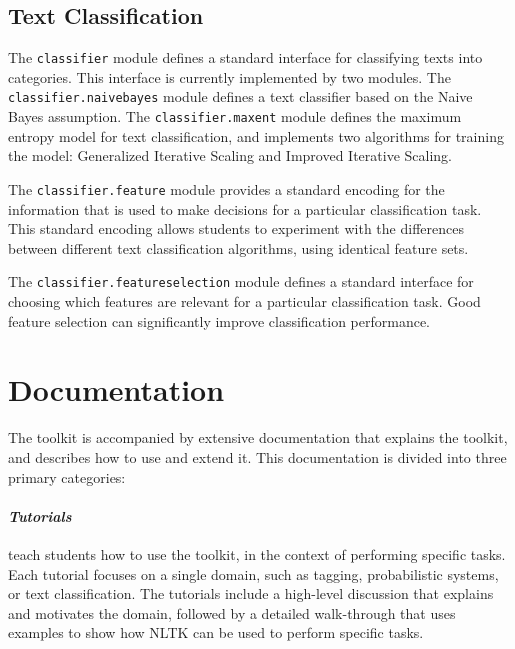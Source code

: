 \documentclass[11pt]{article}
\begin{document}
\subsection*{Text Classification}

The \texttt{classifier} module defines a standard interface for
classifying texts into categories.  This interface is currently
implemented by two modules.  The \texttt{classifier.naivebayes} module
defines a text classifier based on the Naive Bayes assumption. The
\texttt{classifier.maxent} module defines the maximum entropy model
for text classification, and implements two algorithms for training
the model: Generalized Iterative Scaling and Improved Iterative
Scaling.

The \texttt{classifier.feature} module provides a standard encoding
for the information that is used to make decisions for a particular
classification task.  This standard encoding allows students to
experiment with the differences between different text classification
algorithms, using identical feature sets.

The \texttt{classifier.featureselection} module defines a standard
interface for choosing which features are relevant for a particular
classification task.  Good feature selection can significantly improve
classification performance.

\section{Documentation}
\label{sec:documentation}

The toolkit is accompanied by extensive documentation that explains
the toolkit, and describes how to use and extend it.  This
documentation is divided into three primary categories:

\paragraph{\textit{Tutorials}} teach students how to use the toolkit,
in the context of performing specific tasks.  Each tutorial focuses on
a single domain, such as tagging, probabilistic systems, or text
classification.  The tutorials include a high-level discussion that
explains and motivates the domain, followed by a detailed
walk-through that uses examples to show how NLTK can be used to
perform specific tasks.
\end{document}
